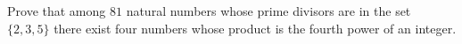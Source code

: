 Prove that among $81$ natural numbers whose prime divisors are in the set $\{2, 3, 5\}$ there exist four numbers whose product is the fourth power of an integer.